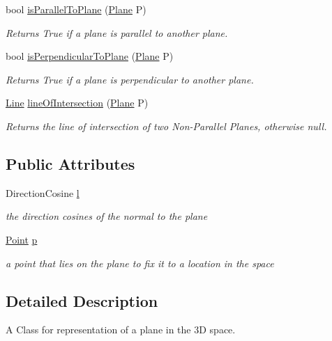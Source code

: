 \begin{DoxyCompactItemize}
bool \mbox{\hyperlink{class_plane_ab00163f615128de1c6bddd2169995e0a}{is\+Parallel\+To\+Plane}} (\mbox{\hyperlink{class_plane}{Plane}} P)
\begin{DoxyCompactList}\small\item\em Returns True if a plane is parallel to another plane. \end{DoxyCompactList}\item 
bool \mbox{\hyperlink{class_plane_a6b175c15e8964820c56686aa19bf18e8}{is\+Perpendicular\+To\+Plane}} (\mbox{\hyperlink{class_plane}{Plane}} P)
\begin{DoxyCompactList}\small\item\em Returns True if a plane is perpendicular to another plane. \end{DoxyCompactList}\item 
\mbox{\hyperlink{class_line}{Line}} \mbox{\hyperlink{class_plane_a04a259828a74830947a30834885b9240}{line\+Of\+Intersection}} (\mbox{\hyperlink{class_plane}{Plane}} P)
\begin{DoxyCompactList}\small\item\em Returns the line of intersection of two Non-\/\+Parallel Planes, otherwise null. \end{DoxyCompactList}\end{DoxyCompactItemize}
\subsection*{Public Attributes}
\begin{DoxyCompactItemize}
\item 
Direction\+Cosine \mbox{\hyperlink{class_plane_aafdc7fc15019da566e4cdf760f1eaf17}{l}}
\begin{DoxyCompactList}\small\item\em the direction cosines of the normal to the plane \end{DoxyCompactList}\item 
\mbox{\hyperlink{class_point}{Point}} \mbox{\hyperlink{class_plane_ad289dccce2529d46275e4fb6878a8625}{p}}
\begin{DoxyCompactList}\small\item\em a point that lies on the plane to fix it to a location in the space \end{DoxyCompactList}\end{DoxyCompactItemize}


\subsection{Detailed Description}
A Class for representation of a plane in the 3D space. 

